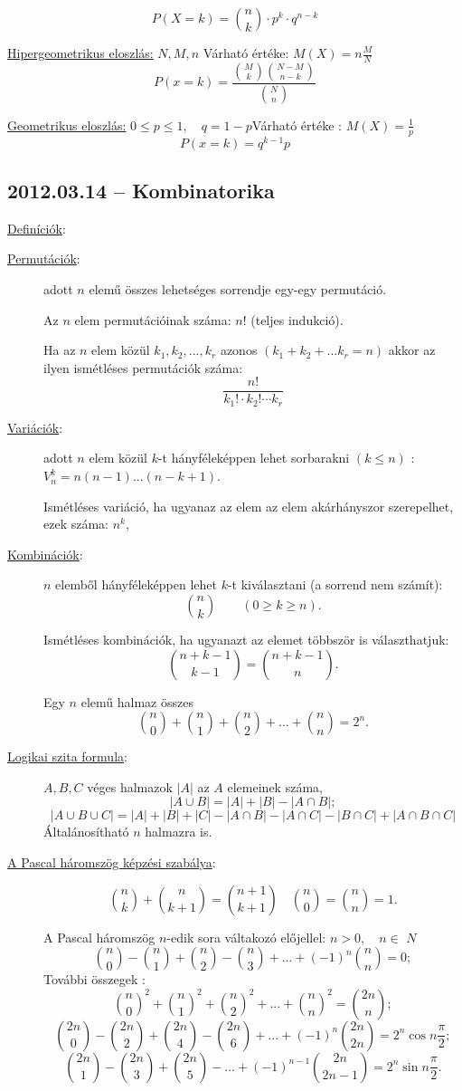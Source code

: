 $$P(X=k)=\binom{n}{k}\cdot p^k \cdot q^{n-k}$$

\noindent
\underline{Hipergeometrikus eloszlás:} $N,M,n$  \qquad Várható értéke: $M(X)=n\frac{M}{N}$
$$P(x=k)=\frac{\binom{M}{k}\binom{N-M}{n-k}}{\binom{N}{n}}$$


\noindent
\underline{Geometrikus eloszlás:} $0\leq p\leq  1,\quad q=1-p$\qquad Várható értéke : $M(X)=\frac{1}{p}$
$$P(x=k)=q^{k-1}p$$ 

\subsection*{2012.03.14 -- Kombinatorika}

\underline{Definíciók}:

\begin{description}
\item[\underline{Permutációk}:] adott $n$ elemű összes lehetséges sorrendje egy-egy permutáció.

Az $n$ elem permutációinak száma: $n!$ (teljes indukció).

Ha az $n$ elem közül $k_1,k_2,...,k_r$ azonos $(k_1+k_2+...k_r=n)$ akkor az ilyen ismétléses permutációk száma: $$\frac{n!}{k_1!\cdot k_2!\cdots k_r}$$

\item[\underline{Variációk}:] adott $n$ elem közül $k$-t hányféleképpen lehet sorbarakni $(k\leq n)$ : $V_n^k=n(n-1)...(n-k+1)$.

Ismétléses variáció, ha ugyanaz az elem az elem akárhányszor szerepelhet, ezek száma: $n^k$,

\item[\underline{Kombinációk}:] $n$ elemből hányféleképpen lehet $k$-t kiválasztani (a sorrend nem számít): $$\binom{n}{k}\qquad (0\geq k\geq n).$$

Ismétléses kombinációk, ha ugyanazt az elemet többször is választhatjuk: $$\binom{n+k-1}{k-1}=\binom{n+k-1}{n}.$$

Egy $n$ elemű halmaz összes $$\binom{n}{0}+\binom{n}{1}+\binom{n}{2}+...+\binom{n}{n}=2^n.$$

\item[\underline{Logikai szita formula}:] $A,B,C$ véges halmazok $|A|$ az $A$ elemeinek száma, $$|A\cup B|=|A|+|B|-|A\cap B|;$$
$$|A\cup B\cup C|=|A|+|B|+|C|-|A\cap B|-|A\cap C|-|B\cap C|+|A\cap B\cap C|$$
Általánosítható $n$ halmazra is.

\item[\underline{A Pascal háromszög képzési szabálya}:]
$$\binom{n}{k}+\binom{n}{k+1}=\binom{n+1}{k+1}\quad\binom{n}{0}=\binom{n}{n}=1.$$

A Pascal háromszög $n$-edik sora váltakozó előjellel: $n>0,\quad n\in$ $N$
$$\binom{n}{0}-\binom{n}{1}+\binom{n}{2}-\binom{n}{3}+...+(-1)^n\binom{n}{n}=0;$$
További összegek :
$${\binom{n}{0}}^2+{\binom{n}{1}}^2+{\binom{n}{2}}^2+...+{\binom{n}{n}}^2=\binom{2n}{n};$$
$$\binom{2n}{0}-\binom{2n}{2}+\binom{2n}{4}-\binom{2n}{6}+...+(-1)^n\binom{2n}{2n}=2^n\cos n\frac{\pi}{2};$$
$$\binom{2n}{1}-\binom{2n}{3}+\binom{2n}{5}-...+(-1)^{n-1}\binom{2n}{2n-1}=2^n\sin n\frac{\pi}{2}.$$

\end{description}
